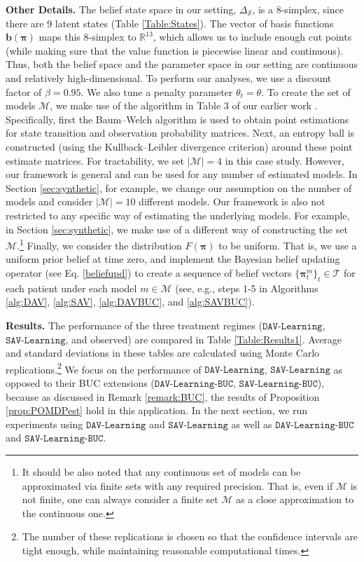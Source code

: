 \documentclass[opre,nonblindrev]{informs2}%
\newcommand{\1}{\hbox{\rm 1\kern-.35em 1}}
\newcommand{\MS}{\mathscr S}
\newcommand{\MT}{\mathscr T}
\newcommand{\MM}{\mathscr M}
\newcommand{\bpi}{\boldsymbol{\pi}}
\newcommand{\bb}{\mathbf{b}}
\newcommand{\SAV}{\texttt{SAV-Learning}}
\newcommand{\DAV}{\texttt{DAV-Learning}}
\newcommand{\SAVBUC}{\texttt{SAV-Learning-BUC}}
\newcommand{\DAVBUC}{\texttt{DAV-Learning-BUC}}
\begin{document}
\noindent\textbf{Other Details.} The belief state space in our setting,   $\Delta_\MS$, is a $8$-simplex, since there are 9 latent states (Table \ref{Table:States}). The vector of basis functions $\bb(\bpi)$ maps this  $8$-simplex to $\mathbb R^{13}$, which allows us to include enough cut points (while making sure that the value function is piecewise linear and continuous).  Thus, both the belief space and the parameter space in our setting are continuous and relatively high-dimensional. To perform our analyses, we use a discount factor of $\beta=0.95$.  We also tune a  penalty parameter $\theta_t=\theta$. To create the set of models $\MM$, we  make use of  the algorithm in Table 3 of our earlier work \citep{Boloori2020}. Specifically, first the Baum–Welch algorithm is used to obtain point estimations for  state transition and observation probability matrices. Next, an entropy ball is constructed (using the Kullback–Leibler divergence criterion) around these point estimate matrices. For tractability, we set $|\MM|=4$ in this case study. However, our framework is general and can be used for any number of estimated models.  In Section \ref{sec:synthetic}, for example, we change our assumption on the number of models  and consider $|\MM|=10$ different models. Our framework is also not restricted to any specific way of estimating the underlying models. For example, in Section \ref{sec:synthetic}, we make use of a  different way of constructing the set $\MM$.\footnote{It should be also noted that any continuous set of models can be approximated via finite sets
with any required precision. That is, even if $\MM$ is not finite, one can always consider a finite set $\MM$ as a close approximation to the continuous one.} Finally, we consider the distribution $F(\bpi)$ to be uniform.  That is, we use a uniform prior belief at time zero, and implement  the Bayesian belief updating operator  (see Eq. \eqref{beliefupd})  to create a sequence of belief vectors $\{\bpi_t^m\}_t\in\MT$ for each patient under each model $m\in\MM$ (see, e.g., steps 1-5 in Algorithms \ref{alg:DAV}, \ref{alg:SAV}, \ref{alg:DAVBUC}, and \ref{alg:SAVBUC}).




\noindent\textbf{Results.} The performance of the three treatment regimes ($\DAV$, $\SAV$, and observed) are compared in Table \ref{Table:Results1}.  Average and standard deviations in these tables are calculated using Monte Carlo replications.\footnote{The number of these replications is chosen so that the confidence intervals are tight enough, while maintaining  reasonable computational times.}  We focus on the performance of $\DAV$, $\SAV$ as opposed to their BUC extensions  ($\DAVBUC$, $\SAVBUC$), because as discussed in Remark \ref{remark:BUC}, the results of Proposition \ref{prop:POMDPest} hold in this application. In the next section, we run experiments using $\DAV$ and $\SAV$ as well as $\DAVBUC$ and $\SAVBUC$.
\end{document}
